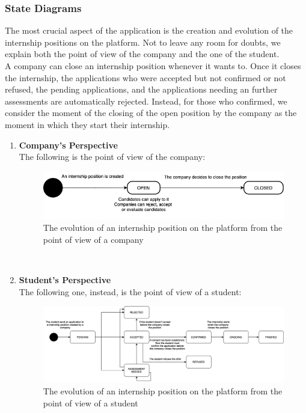     \subsubsection{State Diagrams}
        The most crucial aspect of the application is the creation and evolution of the internship positions on the platform. Not to leave any room for doubts, we explain both the point of view of the company and the one of the student.
        \\
        A company can close an internship position whenever it wants to. Once it closes the internship, the applications who were accepted but not confirmed or not refused, the pending applications, and the applications needing an further assessments are automatically rejected. Instead, for those who confirmed, we consider the moment of the closing of the open position by the company as the moment in which they start their internship.
        \\
        \begin{enumerate}[label=\textbullet, itemsep=0em]
            \item \textbf {Company's Perspective}
            \\The following is the point of view of the company:
            \begin{figure}[h!]
                \centering
                \includegraphics[width=1\textwidth]{RASD/Images/CompanyPOV.png}
                \caption{The evolution of an internship position on the platform from the point of view of a company}
                \label{fig:example}
            \end{figure}
            \\
        
            \item \textbf {Student's Perspective}
            \\The following one, instead, is the point of view of a student:
            \begin{figure}[h!]
                \centering
                \includegraphics[width=1\textwidth]{RASD/Images/StudentPOV.png}
                \caption{The evolution of an internship position on the platform from the point of view of a student}
                \label{fig:example}
            \end{figure}

        \end{enumerate}
        
